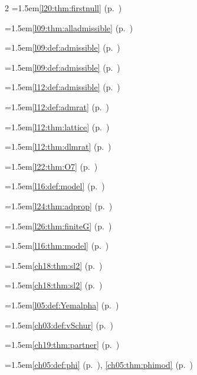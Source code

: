 \begin{multicols}{2}
\hangindent=1.5em\quad \ref{l20:thm:firstnull} (p.~\pageref{l20:thm:firstnull})\par
\hangindent=1.5em\quad \ref{l09:thm:alladmissible} (p.~\pageref{l09:thm:alladmissible})\par
\hangindent=1.5em\quad \ref{l09:def:admissible} (p.~\pageref{l09:def:admissible})\par
\hangindent=1.5em\quad \ref{l09:def:admissible} (p.~\pageref{l09:def:admissible})\par
\hangindent=1.5em\quad \ref{l12:def:admissible} (p.~\pageref{l12:def:admissible})\par
\hangindent=1.5em\quad \ref{l12:def:admrat} (p.~\pageref{l12:def:admrat})\par
\hangindent=1.5em\quad \ref{l12:thm:lattice} (p.~\pageref{l12:thm:lattice})\par
\hangindent=1.5em\quad \ref{l12:thm:dlmrat} (p.~\pageref{l12:thm:dlmrat})\par
\hangindent=1.5em\quad \ref{l22:thm:O7} (p.~\pageref{l22:thm:O7})\par
\hangindent=1.5em\quad \ref{l16:def:model} (p.~\pageref{l16:def:model})\par
\hangindent=1.5em\quad \ref{l24:thm:adprop} (p.~\pageref{l24:thm:adprop})\par
\hangindent=1.5em\quad \ref{l26:thm:finiteG} (p.~\pageref{l26:thm:finiteG})\par
\hangindent=1.5em\quad \ref{l16:thm:model} (p.~\pageref{l16:thm:model})\par
\hangindent=1.5em\quad \ref{ch18:thm:sl2} (p.~\pageref{ch18:thm:sl2})\par
\hangindent=1.5em\quad \ref{ch18:thm:sl2} (p.~\pageref{ch18:thm:sl2})\par
\hangindent=1.5em\quad \ref{l05:def:Yemalpha} (p.~\pageref{l05:def:Yemalpha})\par
\hangindent=1.5em\quad \ref{ch03:def:vSchur} (p.~\pageref{ch03:def:vSchur})\par
\hangindent=1.5em\quad \ref{ch19:thm:partner} (p.~\pageref{ch19:thm:partner})\par
\hangindent=1.5em\quad \ref{ch05:def:phi} (p.~\pageref{ch05:def:phi}), \ref{ch05:thm:phimod} (p.~\pageref{ch05:thm:phimod})\par

\end{multicols}
